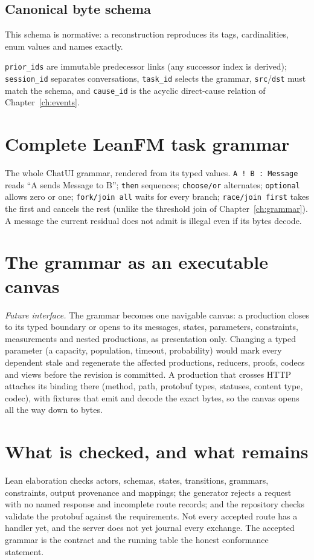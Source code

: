

\subsection{Canonical byte schema}

This schema is normative: a reconstruction reproduces its tags, cardinalities,
enum values and names exactly.



\texttt{prior\_ids} are immutable predecessor links (any successor index is
derived); \texttt{session\_id} separates conversations, \texttt{task\_id} selects
the grammar, \texttt{src}/\texttt{dst} must match the schema, and \texttt{cause\_id}
is the acyclic direct-cause relation of Chapter~\ref{ch:events}.

\section{Complete LeanFM task grammar}

The whole ChatUI grammar, rendered from its typed values. \texttt{A ! B : Message}
reads ``A sends Message to B''; \texttt{then} sequences; \texttt{choose/or}
alternates; \texttt{optional} allows zero or one; \texttt{fork/join all} waits for
every branch; \texttt{race/join first} takes the first and cancels the rest (unlike
the threshold join of Chapter~\ref{ch:grammar}). A message the current residual
does not admit is illegal even if its bytes decode.



\section{The grammar as an executable canvas}

\textit{Future interface.} The grammar becomes one navigable canvas: a production
closes to its typed boundary or opens to its messages, states, parameters,
constraints, measurements and nested productions, as presentation only. Changing a
typed parameter (a capacity, population, timeout, probability) would mark every
dependent stale and regenerate the affected productions, reducers, proofs, codecs
and views before the revision is committed. A production that crosses HTTP attaches
its binding there (method, path, protobuf types, statuses, content type, codec),
with fixtures that emit and decode the exact bytes, so the canvas opens all the way
down to bytes.

\section{What is checked, and what remains}

Lean elaboration checks actors, schemas, states, transitions, grammars,
constraints, output provenance and mappings; the generator rejects a request with
no named response and incomplete route records; and the repository checks validate
the protobuf against the requirements. Not every accepted route has a handler yet,
and the server does not yet journal every exchange. The accepted grammar is the
contract and the running table the honest conformance statement.
